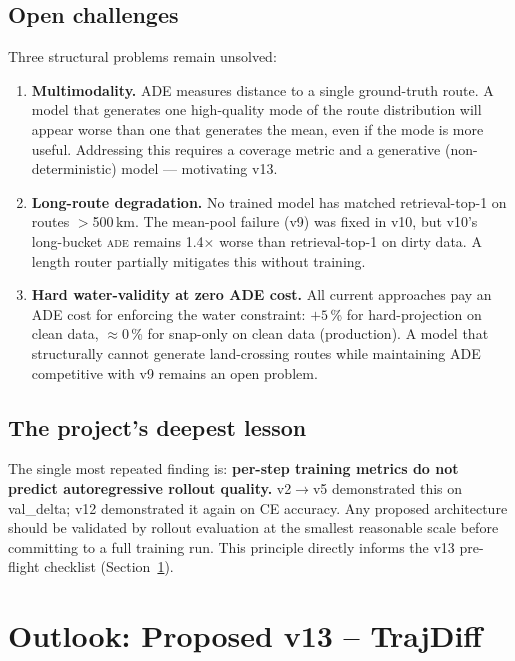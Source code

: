 \documentclass[11pt,a4paper]{article}
\newcommand{\ade}{\textsc{ade}}
\begin{document}
\subsection{Open challenges}

Three structural problems remain unsolved:

\begin{enumerate}
\item \textbf{Multimodality.}  ADE measures distance to a single ground-truth route.
      A model that generates one high-quality mode of the route distribution will
      appear worse than one that generates the mean, even if the mode is more useful.
      Addressing this requires a coverage metric and a generative (non-deterministic)
      model --- motivating v13.
\item \textbf{Long-route degradation.}  No trained model has matched retrieval-top-1
      on routes $>$500\,km.  The mean-pool failure (v9) was fixed in v10, but v10's
      long-bucket \ade{} remains 1.4$\times$ worse than retrieval-top-1 on dirty data.
      A length router partially mitigates this without training.
\item \textbf{Hard water-validity at zero ADE cost.}
      All current approaches pay an ADE cost for enforcing the water constraint:
      $+5$\,\% for hard-projection on clean data, $\approx$0\,\% for snap-only
      on clean data (production).
      A model that structurally cannot generate land-crossing routes
      while maintaining ADE competitive with v9 remains an open problem.
\end{enumerate}

\subsection{The project's deepest lesson}

The single most repeated finding is:
\textbf{per-step training metrics do not predict autoregressive rollout quality.}
v2$\to$v5 demonstrated this on val\_delta; v12 demonstrated it again on CE accuracy.
Any proposed architecture should be validated by rollout evaluation at the smallest
reasonable scale before committing to a full training run.
This principle directly informs the v13 pre-flight checklist (Section~\ref{sec:future}).

\section{Outlook: Proposed v13 -- TrajDiff}
\label{sec:future}
\end{document}
